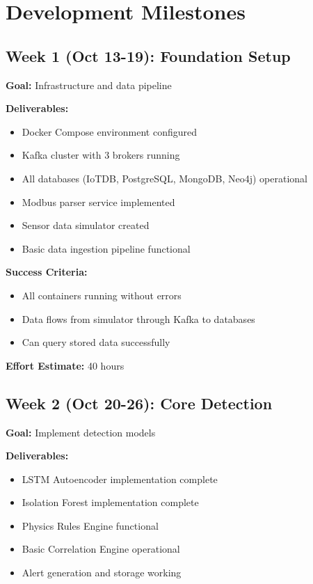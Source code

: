 \documentclass[12pt,a4paper]{article}
\begin{document}
\section{Development Milestones}

\subsection{Week 1 (Oct 13-19): Foundation Setup}

\textbf{Goal:} Infrastructure and data pipeline

\textbf{Deliverables:}
\begin{itemize}[leftmargin=1cm,itemsep=0pt]
    \item Docker Compose environment configured
    \item Kafka cluster with 3 brokers running
    \item All databases (IoTDB, PostgreSQL, MongoDB, Neo4j) operational
    \item Modbus parser service implemented
    \item Sensor data simulator created
    \item Basic data ingestion pipeline functional
\end{itemize}

\textbf{Success Criteria:}
\begin{itemize}[leftmargin=1cm,itemsep=0pt]
    \item All containers running without errors
    \item Data flows from simulator through Kafka to databases
    \item Can query stored data successfully
\end{itemize}

\textbf{Effort Estimate:} 40 hours

\subsection{Week 2 (Oct 20-26): Core Detection}

\textbf{Goal:} Implement detection models

\textbf{Deliverables:}
\begin{itemize}[leftmargin=1cm,itemsep=0pt]
    \item LSTM Autoencoder implementation complete
    \item Isolation Forest implementation complete
    \item Physics Rules Engine functional
    \item Basic Correlation Engine operational
    \item Alert generation and storage working
\end{itemize}
\end{document}
